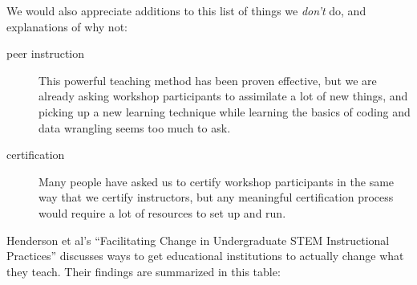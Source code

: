 We would also appreciate additions to this list of things we
\emph{don't} do, and explanations of why not:

\begin{description}
\item[peer instruction]
This powerful teaching method has been proven effective, but we are
already asking workshop participants to assimilate a lot of new things,
and picking up a new learning technique while learning the basics of
coding and data wrangling seems too much to ask.
\item[certification]
Many people have asked us to certify workshop participants in the same
way that we certify instructors, but any meaningful certification
process would require a lot of resources to set up and run.
\end{description}


Henderson et al's
``Facilitating Change in Undergraduate STEM Instructional Practices''
\cite{bib:henderson-facilitating}
discusses ways
to get educational institutions to actually change what they teach.
Their findings are summarized in this table:

